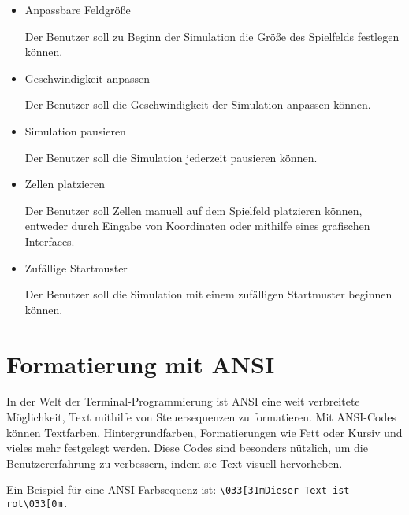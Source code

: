 \documentclass[12pt,a4paper]{article}
\begin{document}
\begin{itemize}
    \item Anpassbare Feldgröße\par
    Der Benutzer soll zu Beginn der Simulation die Größe des Spielfelds festlegen können.

    \item Geschwindigkeit anpassen\par 
    Der Benutzer soll die Geschwindigkeit der Simulation anpassen können.
    
    \item Simulation pausieren\par
    Der Benutzer soll die Simulation jederzeit pausieren können.
    
    \item Zellen platzieren\par
    Der Benutzer soll Zellen manuell auf dem Spielfeld platzieren können, entweder durch Eingabe von Koordinaten oder mithilfe eines grafischen Interfaces.

    \item Zufällige Startmuster\par
    Der Benutzer soll die Simulation mit einem zufälligen Startmuster beginnen können.
\end{itemize}


\newpage
{}
\setcounter{section}{0}
\renewcommand{\thesection}{\Roman{section}}

\section{Formatierung mit ANSI}

In der Welt der Terminal-Programmierung ist ANSI eine weit verbreitete Möglichkeit, Text mithilfe von Steuersequenzen zu formatieren. Mit ANSI-Codes können Textfarben, Hintergrundfarben, Formatierungen wie Fett oder Kursiv und vieles mehr festgelegt werden. Diese Codes sind besonders nützlich, um die Benutzererfahrung zu verbessern, indem sie Text visuell hervorheben.

Ein Beispiel für eine ANSI-Farbsequenz ist:
\texttt{\textbackslash033[31mDieser Text ist rot\textbackslash033[0m.}
\end{document}
